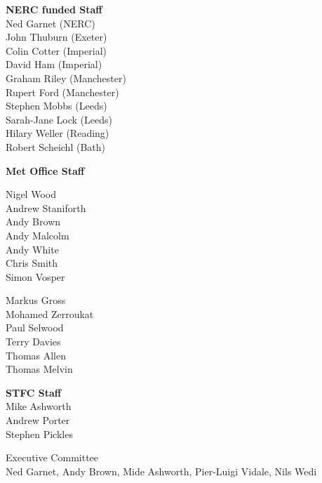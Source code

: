 \begin{slide}{}
\begin{center}
\small
\begin{minipage}[t]{0.3\linewidth}\centering
{\bf NERC funded Staff \\}
Ned Garnet (NERC)\\
John Thuburn (Exeter)\\
Colin Cotter (Imperial)\\
David Ham (Imperial)\\
Graham Riley (Manchester) \\
Rupert Ford (Manchester) \\
Stephen Mobbs (Leeds) \\
Sarah-Jane Lock (Leeds) \\
Hilary Weller (Reading) \\
Robert Scheichl (Bath) \\
\end{minipage}
\begin{minipage}[t]{0.43\linewidth}\centering
{\bf Met Office Staff \\}
\begin{minipage}[t]{0.49\linewidth}\centering
Nigel Wood \\
Andrew Staniforth \\
Andy Brown \\
Andy Malcolm \\
Andy White \\
Chris Smith \\
Simon Vosper
\end{minipage}
\begin{minipage}[t]{0.49\linewidth}\centering
Markus Gross \\
Mohamed Zerroukat \\
Paul Selwood \\
Terry Davies \\
Thomas Allen \\
Thomas Melvin \\
\end{minipage}
\end{minipage}
\begin{minipage}[t]{0.25\linewidth}\centering
{\bf STFC Staff \\}
Mike Ashworth \\
Andrew Porter \\
Stephen Pickles
\end{minipage}

Executive Committee\\
Ned Garnet, Andy Brown, Mide Ashworth, Pier-Luigi Vidale, Nils Wedi

\end{center}
\end{slide}
